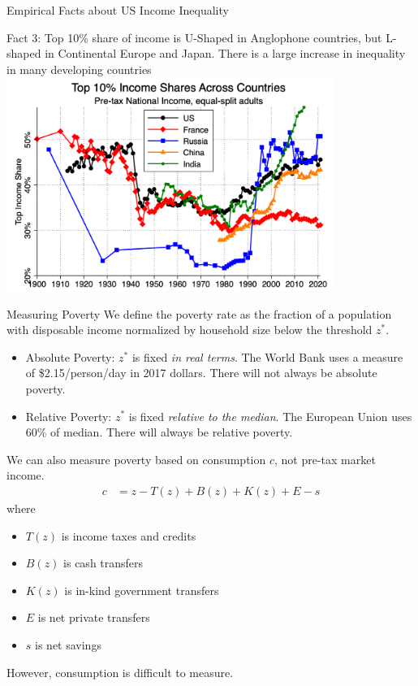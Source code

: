 \documentclass[10pt]{extarticle}
\begin{document}
\begin{problem}{Empirical Facts about US Income Inequality}
\begin{center}
    \end{center}
    \begin{center}
      Fact 3: Top 10\% share of income is U-Shaped in Anglophone countries, but L-shaped in Continental Europe and Japan. There is a large increase in inequality in many developing countries\\
      \includegraphics[width=0.8\textwidth]{images/country_inequality.png}
    \end{center}
  \end{problem}
  \begin{problem}{Measuring Poverty}
    We define the poverty rate as the fraction of a population with disposable income normalized by household size below the threshold $z^*$.
    \begin{itemize}
      \item Absolute Poverty: $z^*$ is fixed \textit{in real terms}. The World Bank uses a measure of \$2.15/person/day in 2017 dollars. There will not always be absolute poverty.
      \item Relative Poverty: $z^*$ is fixed \textit{relative to the median}. The European Union uses 60\% of median. There will always be relative poverty.
    \end{itemize}
    We can also measure poverty based on consumption $c$, not pre-tax market income.
    \begin{align*}
      c &= z - T(z) + B(z) + K(z) + E - s
    \end{align*}
    where
    \begin{itemize}
      \item $T(z)$ is income taxes and credits
      \item $B(z)$ is cash transfers
      \item $K(z)$ is in-kind government transfers
      \item $E$ is net private transfers
      \item $s$ is net savings
    \end{itemize}
    However, consumption is difficult to measure.
  \end{problem}
\end{document}
